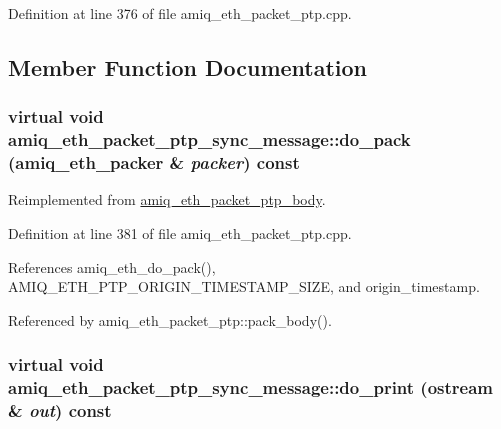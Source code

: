 Definition at line 376 of file amiq\_\-eth\_\-packet\_\-ptp.cpp.

\subsection{Member Function Documentation}
\hypertarget{classamiq__eth__packet__ptp__sync__message_a5bb7abd15c0d2d2d733f042ad13c898d}{
\subsubsection[{do\_\-pack}]{\setlength{\rightskip}{0pt plus 5cm}virtual void amiq\_\-eth\_\-packet\_\-ptp\_\-sync\_\-message::do\_\-pack ({\bf amiq\_\-eth\_\-packer} \& {\em packer}) const}}
\label{classamiq__eth__packet__ptp__sync__message_a5bb7abd15c0d2d2d733f042ad13c898d}


Reimplemented from \hyperlink{classamiq__eth__packet__ptp__body_a3df3ad9b3a4ef7ec42357565d44ede05}{amiq\_\-eth\_\-packet\_\-ptp\_\-body}.

Definition at line 381 of file amiq\_\-eth\_\-packet\_\-ptp.cpp.

References amiq\_\-eth\_\-do\_\-pack(), AMIQ\_\-ETH\_\-PTP\_\-ORIGIN\_\-TIMESTAMP\_\-SIZE, and origin\_\-timestamp.

Referenced by amiq\_\-eth\_\-packet\_\-ptp::pack\_\-body().\hypertarget{classamiq__eth__packet__ptp__sync__message_a3eca4a1338800bcac5fdac104f350366}{
\subsubsection[{do\_\-print}]{\setlength{\rightskip}{0pt plus 5cm}virtual void amiq\_\-eth\_\-packet\_\-ptp\_\-sync\_\-message::do\_\-print (ostream \& {\em out}) const}}
\label{classamiq__eth__packet__ptp__sync__message_a3eca4a1338800bcac5fdac104f350366}


